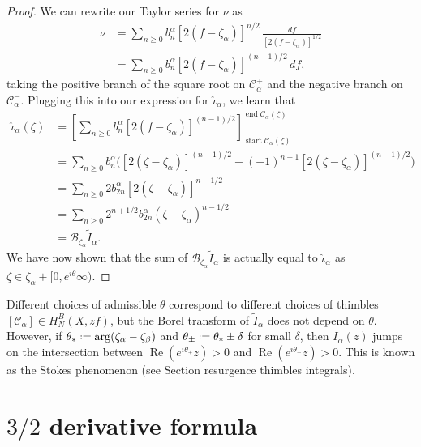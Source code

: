 \documentclass[11pt,a4paper,twoside,leqno,noamsfonts]{amsart}
\numberwithin{equation}{section}
\begin{document}
\begin{proof}
We can rewrite our Taylor series for $\nu$ as
\begin{align*}
\nu & = \sum_{n \ge 0} b_n^\alpha [2(f - \zeta_\alpha)]^{n/2}\,\frac{df}{[2(f - \zeta_\alpha)]^{1/2}} \\
& = \sum_{n \ge 0} b_n^\alpha [2(f - \zeta_\alpha)]^{(n - 1)/2}\,df,
\end{align*}
taking the positive branch of the square root on $\mathcal{C}^+_\alpha$ and the negative branch on $\mathcal{C}^-_\alpha$. Plugging this into our expression for $\hat{\iota}_\alpha$, we learn that
\begin{align*}
\hat{\iota}_\alpha(\zeta) & = \left[ \sum_{n \ge 0} b_n^\alpha [2(f - \zeta_\alpha)]^{(n - 1)/2} \right]_{\operatorname{start} \mathcal{C}_\alpha(\zeta)}^{\operatorname{end} \mathcal{C}_\alpha(\zeta)} \\
& = \sum_{n \ge 0} b_n^\alpha \Big( [2(\zeta - \zeta_\alpha)]^{(n - 1)/2} - (-1)^{n-1}[2(\zeta - \zeta_\alpha)]^{(n - 1)/2} \Big) \\
& = \sum_{n \ge 0} 2 b_{2n}^\alpha [2(\zeta - \zeta_\alpha)]^{n - 1/2} \\
& = \sum_{n \ge 0} 2^{n+1/2} b_{2n}^\alpha (\zeta - \zeta_\alpha)^{n - 1/2} \\
& = \mathcal{B}_{\zeta_\alpha} \tilde{I}_\alpha.
\end{align*}
We have now shown that the sum of $\mathcal{B}_{\zeta_\alpha} \tilde{I}_\alpha$ is actually equal to $\hat{\iota}_\alpha$ as $\zeta\in\zeta_\alpha+[0,e^{i\theta}\infty)$.
\end{proof}

\begin{remark}
Different choices of admissible $\theta$ correspond to different choices of thimbles $[\mathcal{C}_{\alpha}]\in H_N^{B}(X,zf)$, but the Borel transform of $\tilde{I}_{\alpha}$ does not depend on $\theta$. However, if $\theta_*\defeq\arg(\zeta_{\alpha}-\zeta_{\beta})$ and $\theta_{\pm}\defeq\theta_*\pm\delta$ for small $\delta$, then $I_{\alpha}(z)$ jumps on the intersection between $\operatorname{Re}(e^{i\theta_+}z)>0$ and $\operatorname{Re}(e^{i\theta_-}z)>0$. This is known as the Stokes phenomenon (see Section resurgence thimbles integrals).  
\end{remark}

\section{$3/2$ derivative formula}
\end{document}
